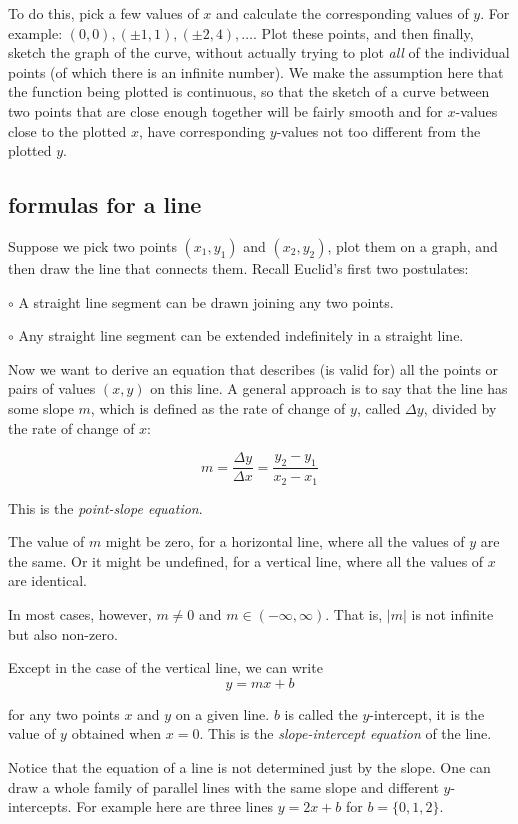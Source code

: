 \documentclass[11pt, oneside]{article}
\begin{document}
To do this, pick a few values of $x$ and calculate the corresponding values of $y$.  For example:  $(0,0), (\pm 1,1), (\pm 2, 4), \dots$.  Plot these points, and then finally, sketch the graph of the curve, without actually trying to plot \emph{all} of the individual points (of which there is an infinite number).  We make the assumption here that the function being plotted is continuous, so that the sketch of a curve between two points that are close enough together will be fairly smooth and for $x$-values close to the plotted $x$, have corresponding $y$-values not too different from the plotted $y$.

\subsection*{formulas for a line}

Suppose we pick two points $(x_1,y_1)$ and $(x_2,y_2)$, plot them on a graph, and then draw the line that connects them.  Recall Euclid's first two postulates:

$\circ$  A straight line segment can be drawn joining any two points.

$\circ$   Any straight line segment can be extended indefinitely in a straight line.
 
Now we want to derive an equation that describes (is valid for) all the points or pairs of values $(x,y)$ on this line.  A general approach is to say that the line has some slope $m$, which is defined as the rate of change of $y$, called $\Delta y$, divided by the rate of change of $x$:

\[ m = \frac{\Delta y}{\Delta x} = \frac{y_2 - y_1}{x_2 - x_1} \]

This is the \emph{point-slope equation}.

The value of $m$ might be zero, for a horizontal line, where all the values of $y$ are the same.  Or it might be undefined, for a vertical line, where all the values of $x$ are identical.  

In most cases, however, $m \ne 0$ and $m \in (-\infty, \infty)$.  That is, $|m|$ is not infinite but also non-zero.

Except in the case of the vertical line, we can write
\[ y = mx + b \]

for any two points $x$ and $y$ on a given line.  $b$ is called the $y$-intercept, it is the value of $y$ obtained when $x = 0$.  This is the \emph{slope-intercept equation} of the line.

Notice that the equation of a line is not determined just by the slope.  One can draw a whole family of parallel lines with the same slope and different $y$-intercepts.  For example here are three lines $y = 2x + b$ for $b = \{ 0, 1, 2 \}$.
\end{document}
